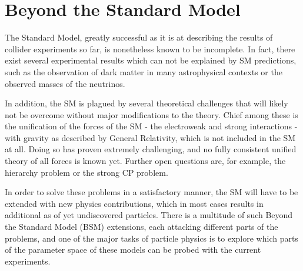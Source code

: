 






\section{Beyond the Standard Model}
\label{sec:theory:bsm}

The Standard Model, greatly successful as it is at describing the results of collider experiments so far, is nonetheless known to be incomplete. In fact, there exist several experimental results which can not be explained by SM predictions, such as the observation of dark matter in many astrophysical contexts or the observed masses of the neutrinos. 

In addition, the SM is plagued by several theoretical challenges that will likely not be overcome without major modifications to the theory. Chief among these is the unification of the forces of the SM - the electroweak and strong interactions - with gravity as described by General Relativity, which is not included in the SM at all. Doing so has proven extremely challenging, and no fully consistent unified theory of all forces is known yet. Further open questions are, for example, the hierarchy problem or the strong CP problem.

In order to solve these problems in a satisfactory manner, the SM will have to be extended with new physics contributions, which in most cases results in additional as of yet undiscovered particles. There is a multitude of such Beyond the Standard Model (BSM) extensions, each attacking different parts of the problems, and one of the major tasks of particle physics is to explore which parts of the parameter space of these models can be probed with the current experiments.

